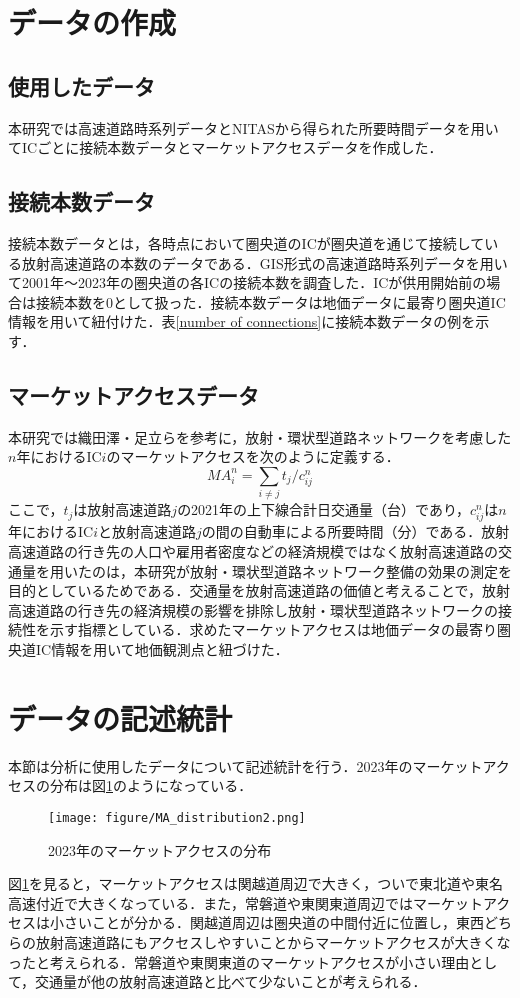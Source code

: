 \section{データの作成}
\subsection{使用したデータ}
本研究では高速道路時系列データとNITASから得られた所要時間データを用いてICごとに接続本数データとマーケットアクセスデータを作成した．

\subsection{接続本数データ}
接続本数データとは，各時点において圏央道のICが圏央道を通じて接続している放射高速道路の本数のデータである．GIS形式の高速道路時系列データを用いて2001年〜2023年の圏央道の各ICの接続本数を調査した．ICが供用開始前の場合は接続本数を0として扱った．接続本数データは地価データに最寄り圏央道IC情報を用いて紐付けた．表\ref{number of connections}に接続本数データの例を示す．



\subsection{マーケットアクセスデータ}
本研究では織田澤・足立らを参考に，放射・環状型道路ネットワークを考慮した$n$年におけるIC$i$のマーケットアクセスを次のように定義する．
\[{MA}^{n}_{i} = \sum_{i \neq j}{t_{j}/c^{n}_{ij}}\]
ここで，$t_{j}$は放射高速道路$j$の2021年の上下線合計日交通量（台）であり，$c^{n}_{ij}$は$n$年におけるIC$i$と放射高速道路$j$の間の自動車による所要時間（分）である．放射高速道路の行き先の人口や雇用者密度などの経済規模ではなく放射高速道路の交通量を用いたのは，本研究が放射・環状型道路ネットワーク整備の効果の測定を目的としているためである．交通量を放射高速道路の価値と考えることで，放射高速道路の行き先の経済規模の影響を排除し放射・環状型道路ネットワークの接続性を示す指標としている．求めたマーケットアクセスは地価データの最寄り圏央道IC情報を用いて地価観測点と紐づけた．

\section{データの記述統計}
 本節は分析に使用したデータについて記述統計を行う．2023年のマーケットアクセスの分布は図\ref{MA_2023_distribution}のようになっている．
 \begin{figure}[H]
  \centering
  \texttt{[image: figure/MA\_distribution2.png]}
  \caption{2023年のマーケットアクセスの分布}
  \label{MA_2023_distribution}
\end{figure}
図\ref{MA_2023_distribution}を見ると，マーケットアクセスは関越道周辺で大きく，ついで東北道や東名高速付近で大きくなっている．また，常磐道や東関東道周辺ではマーケットアクセスは小さいことが分かる．関越道周辺は圏央道の中間付近に位置し，東西どちらの放射高速道路にもアクセスしやすいことからマーケットアクセスが大きくなったと考えられる．常磐道や東関東道のマーケットアクセスが小さい理由として，交通量が他の放射高速道路と比べて少ないことが考えられる．


